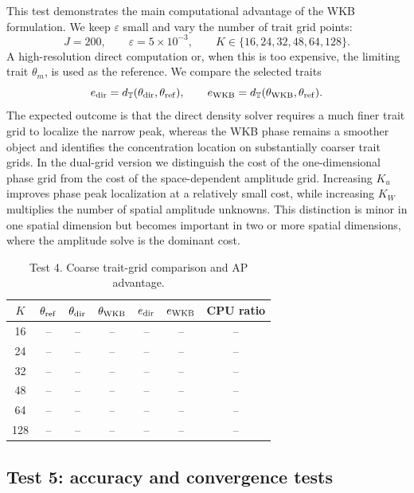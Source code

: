 \documentclass[11pt]{article}
\begin{document}
This test demonstrates the main computational advantage of the WKB formulation.  We keep \(\varepsilon\) small and vary the number of trait grid points:
\[
    J=200,
    \qquad
    \varepsilon=5\times10^{-3},
    \qquad
    K\in\{16,24,32,48,64,128\}.
\]
A high-resolution direct computation or, when this is too expensive, the limiting trait \(\theta_m\), is used as the reference.  We compare the selected traits
\[
    e_{\rm dir}=d_{\mathbb T}(\theta_{\rm dir},\theta_{\rm ref}),
    \qquad
    e_{\rm WKB}=d_{\mathbb T}(\theta_{\rm WKB},\theta_{\rm ref}).
\]
The expected outcome is that the direct density solver requires a much finer trait grid to localize the narrow peak, whereas the WKB phase remains a smoother object and identifies the concentration location on substantially coarser trait grids.  {\color{red} In the dual-grid version we distinguish the cost of the one-dimensional phase grid from the cost of the space-dependent amplitude grid.  Increasing \(K_u\) improves phase peak localization at a relatively small cost, while increasing \(K_W\) multiplies the number of spatial amplitude unknowns.  This distinction is minor in one spatial dimension but becomes important in two or more spatial dimensions, where the amplitude solve is the dominant cost.}

\begin{table}[ht]
\centering
\caption{Test 4. Coarse trait-grid comparison and AP advantage.}
\begin{tabular}{ccccccc}
\toprule
$K$ & $\theta_{\rm ref}$ & $\theta_{\rm dir}$ & $\theta_{\rm WKB}$ & $e_{\rm dir}$ & $e_{\rm WKB}$ & CPU ratio\\
\midrule
16 & -- & -- & -- & -- & -- & --\\
24 & -- & -- & -- & -- & -- & --\\
32 & -- & -- & -- & -- & -- & --\\
48 & -- & -- & -- & -- & -- & --\\
64 & -- & -- & -- & -- & -- & --\\
128 & -- & -- & -- & -- & -- & --\\
\bottomrule
\end{tabular}
\end{table}

\subsection{Test 5: accuracy and convergence tests}\label{subsec:test_accuracy_new}
\end{document}
